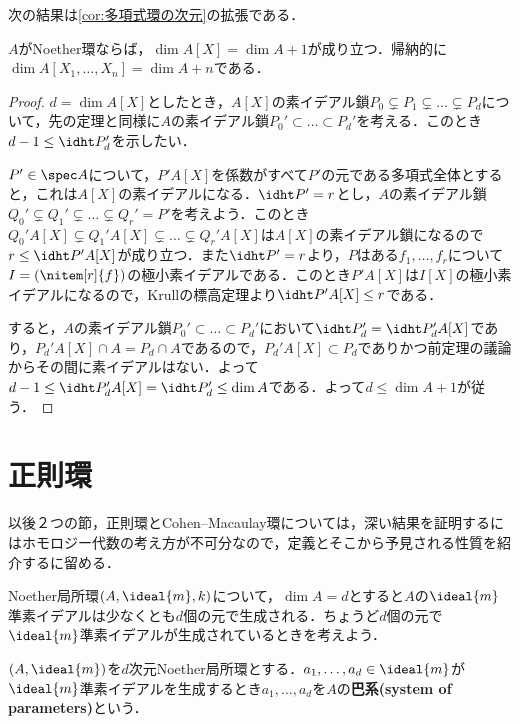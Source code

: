 次の結果は\ref{cor:多項式環の次元}の拡張である．

\begin{cor}\label{cor:Noether多項式の次元}
	$A$がNoether環ならば，$\dim A[X]=\dim A+1$が成り立つ．帰納的に$\dim A[X_1,\dots,X_n]=\dim A+n$である．
\end{cor}

\begin{proof}
	$d=\dim A[X]$としたとき，$A[X]$の素イデアル鎖$P_0\subsetneq P_1\subsetneq\dots\subsetneq P_d$について，先の定理と同様に$A$の素イデアル鎖$P_0'\subset\dots\subset P_d'$を考える．このとき$d-1\leq\idht P_d'$を示したい．
	
	$P'\in\spec A$について，$P'A[X]$を係数がすべて$P'$の元である多項式全体とすると，これは$A[X]$の素イデアルになる．$\idht P'=r$とし，$A$の素イデアル鎖$Q_0'\subsetneq Q_1'\subsetneq\dots\subsetneq Q_r'=P'$を考えよう．このとき$Q_0'A[X]\subsetneq Q_1'A[X]\subsetneq\dots\subsetneq Q_r'A[X]$は$A[X]$の素イデアル鎖になるので$r\leq\idht P'A[X]$が成り立つ．また$\idht P'=r$より，$P$はある$f_1,\dots,f_r$について$I=(\nitem[r]{f})$の極小素イデアルである．このとき$P'A[X]$は$I[X]$の極小素イデアルになるので，Krullの標高定理より$\idht P'A[X]\leq r$である．
	
	すると，$A$の素イデアル鎖$P_0'\subset\dots\subset P_d'$において$\idht P_d'=\idht P_d'A[X]$であり，$P_d'A[X]\cap A=P_d\cap A$であるので，$P_d'A[X]\subset P_d$でありかつ前定理の議論からその間に素イデアルはない．よって$d-1\leq\idht P_d'A[X]=\idht P_d'\leq\dim A$である．よって$d\leq\dim A+1$が従う．
\end{proof}

\section{正則環}

以後２つの節，正則環とCohen--Macaulay環については，深い結果を証明するにはホモロジー代数の考え方が不可分なので，定義とそこから予見される性質を紹介するに留める．

Noether局所環$(A,\ideal{m},k)$について，$\dim A=d$とすると$A$の$\ideal{m}$準素イデアルは少なくとも$d$個の元で生成される．ちょうど$d$個の元で$\ideal{m}$準素イデアルが生成されているときを考えよう．
\begin{defi}[巴系]
	$(A,\ideal{m})$を$d$次元Noether局所環とする．$a_1,\dots,a_d\in\ideal{m}$が$\ideal{m}$準素イデアルを生成するとき$a_1,\dots,a_d$を$A$の\textbf{巴系(system of parameters)}という．
\end{defi}

